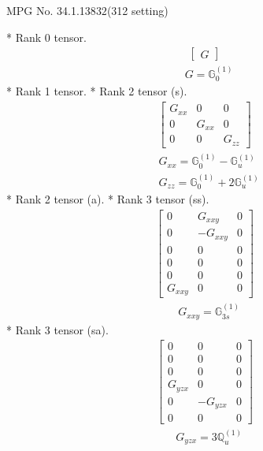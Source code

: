 \documentclass[fleqn,8pt,landscape]{jsarticle}
\begin{document}
\setcounter{MaxMatrixCols}{32}

\renewcommand{\tablename}{Table~}
\renewcommand{\figurename}{Figure~}
\begin{center}
\LARGE
MPG No. 34.1.138\quad$32$\quad(312 setting)
\end{center}
* Rank 0 tensor.
\begin{align*}
\begin{bmatrix} G \end{bmatrix}
\end{align*}
\begin{align*}
& G = \mathbb{G}_{0}^{(1)}
\end{align*}
* Rank 1 tensor.
* Rank 2 tensor (s).
\begin{align*}
\begin{bmatrix} G_{xx} & 0 & 0 \\ 0 & G_{xx} & 0 \\ 0 & 0 & G_{zz} \end{bmatrix}
\end{align*}
\begin{align*}
& G_{xx} = \mathbb{G}_{0}^{(1)} - \mathbb{G}_{u}^{(1)} \\
& G_{zz} = \mathbb{G}_{0}^{(1)} + 2 \mathbb{G}_{u}^{(1)}
\end{align*}
* Rank 2 tensor (a).
* Rank 3 tensor (ss).
\begin{align*}
\begin{bmatrix} 0 & G_{xxy} & 0 \\ 0 & - G_{xxy} & 0 \\ 0 & 0 & 0 \\ 0 & 0 & 0 \\ 0 & 0 & 0 \\ G_{xxy} & 0 & 0 \end{bmatrix}
\end{align*}
\begin{align*}
& G_{xxy} = \mathbb{G}_{3s}^{(1)}
\end{align*}
* Rank 3 tensor (sa).
\begin{align*}
\begin{bmatrix} 0 & 0 & 0 \\ 0 & 0 & 0 \\ 0 & 0 & 0 \\ G_{yzx} & 0 & 0 \\ 0 & - G_{yzx} & 0 \\ 0 & 0 & 0 \end{bmatrix}
\end{align*}
\begin{align*}
& G_{yzx} = 3 \mathbb{Q}_{u}^{(1)}
\end{align*}
\end{document}
